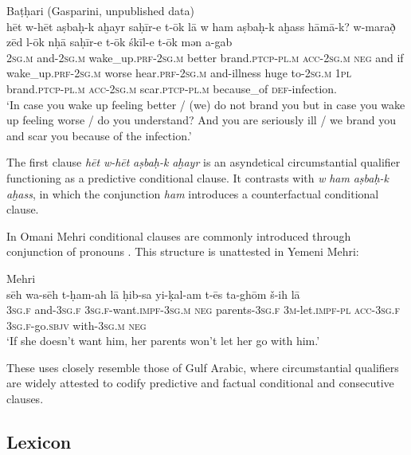 \documentclass[output=paper]{langsci/langscibook}
\begin{document}
\ea\label{ex:key:het}
{Baṭḥari (Gasparini, unpublished data)}\\
\gll hēt w-hēt aṣbaḥ-k aḫayr saḥīr-e t-ōk lā w ham aṣbaḥ-k aḫass hāmā-k? w-marað̣ zēd l-ōk nḥā saḥīr-e t-ōk śkīl-e t-ōk mən a-gab\\
     \textsc{2sg.m} and-\textsc{2sg.m} wake\_up\textsc{.prf}-\textsc{2sg.m} better brand.\textsc{ptcp-pl.m} \textsc{acc-2sg.m} \textsc{neg} and if wake\_up.\textsc{prf-2sg.m} worse hear.\textsc{prf-2sg.m} and-illness huge to-\textsc{2sg.m} \textsc{1pl} brand.\textsc{ptcp-pl.m} \textsc{acc-2sg.m} scar.\textsc{ptcp-pl.m} because\_of \textsc{def}-infection.\\
\glt `In case you wake up feeling better / (we) do not brand you but in case you wake up feeling worse / do you understand? And you are seriously ill / we brand you and scar you because of the infection.'
\z

The first clause \textit{hēt} \textit{w-hēt} \textit{aṣbaḥ-k } \textit{aḫayr} is an asyndetical circumstantial qualifier functioning as a predictive conditional clause. It contrasts with \textit{w} \textit{ham} \textit{aṣbaḥ-k} \textit{aḫass}, in which the conjunction \textit{ham} introduces a counterfactual conditional clause. 

In Omani Mehri conditional clauses are commonly introduced through conjunction of pronouns \citep[211]{WatsonAl-Mahriforthcoming}. This structure is unattested in Yemeni Mehri:

\ea\label{ex:key:}
{Mehri \citep[211]{WatsonAl-Mahriforthcoming}}\\
\gll     sēh wa-sēh t-ḥam-ah lā ḥib-sa yi-ḳal-am t-ēs ta-ghōm š-ih lā\\
     \textsc{3sg.f} and-\textsc{3sg.f} \textsc{3sg.f}{}-want.\textsc{impf-3sg.m} \textsc{neg} parents-\textsc{3sg.f} \textsc{3m}-let.\textsc{impf-pl} \textsc{acc-3sg.f} \textsc{3sg.f}-go.\textsc{sbjv} with-\textsc{3sg.m} \textsc{neg}\\
\glt  `If she doesn’t want him, her parents won’t let her go with him.'\\
\z
     
These uses closely resemble those of Gulf Arabic, where circumstantial qualifiers are widely attested to codify predictive and factual conditional and consecutive clauses.


 
 \subsection{Lexicon}\label{sec:key:lex}
\end{document}
